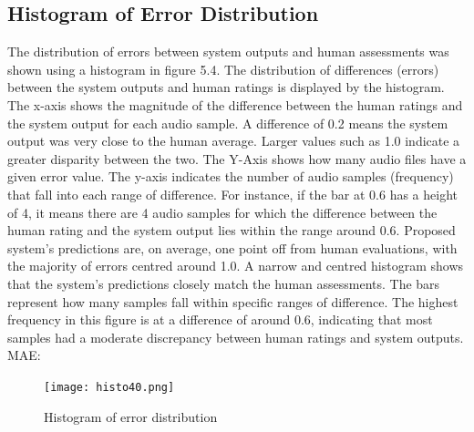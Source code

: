\documentclass[Arial,12pt,openright,twoside]{book}
\begin{document}
\subsection{Histogram of Error Distribution}
The distribution of errors between system outputs and human assessments was shown using a histogram in figure 5.4. The distribution of differences (errors) between the system outputs and human ratings is displayed by the histogram. The x-axis shows the magnitude of the difference between the human ratings and the system output for each audio sample. A difference of 0.2  means the system output was very close to the human average. Larger values such as 1.0 indicate a greater disparity between the two. The Y-Axis shows how many audio files have a given error value. The y-axis indicates the number of audio samples (frequency) that fall into each range of difference. For instance, if the bar at 0.6  has a height of 4, it means there are 4 audio samples for which the difference between the human rating and the system output lies within the range around 0.6.
Proposed system's predictions are, on average, one point off from human evaluations, with the majority of errors centred around 1.0. A narrow and centred histogram shows that the system's predictions closely match the human assessments. The bars represent how many samples fall within specific ranges of difference. The highest frequency in this figure is at a difference of around 0.6, indicating that most samples had a moderate discrepancy between human ratings and system outputs.
MAE: 
\vspace{10pt} %
 \begin{figure}[H]
    \centering
    \texttt{[image: histo40.png]}
    \caption{Histogram of error distribution}
    \label{fig:system_architecture}
\end{figure}
\vspace{10pt} %
\end{document}
